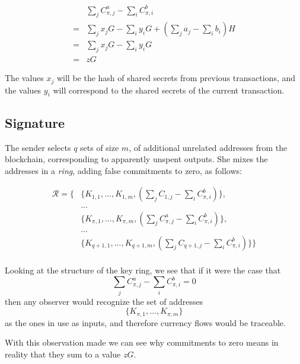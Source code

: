 \begin{align*}
& \sum\limits_j C^a_{\pi, j} - \sum\limits_i C^b_{\pi, i} \\
= & \sum\limits_j x_j G - \sum\limits_i y_i G + (\sum\limits_j  a_j - \sum\limits_i  b_i) H\\
= & \sum\limits_j x_j G - \sum\limits_i y_i G \\
= & z G
\end{align*}

The values \(x_j\) will be the hash of shared secrets from previous transactions, and the values
\(y_i\) will correspond to the shared secrets of the current transaction. 





\subsection{Signature}
\label{full-signature}



The sender selects \(q\) sets of size \(m\), of additional unrelated addresses from the blockchain, corresponding to apparently unspent outputs. 
She mixes the addresses in a {\em ring}, adding false commitments to zero, as follows:

\begin{align*}
  \mathcal{R} = \{ &\{K_{1, 1}, ..., K_{1, m}, (\sum\limits_j C_{1, j} - \sum\limits_i C^b_{\pi,i})\}, \\
  &... \\
  &\{K_{\pi, 1}, ..., K_{\pi, m}, (\sum\limits_j C^a_{\pi, j} - \sum\limits_i C^b_{\pi,i})\}, \\
  &... \\
  &\{K_{q+1, 1}, ..., K_{q+1, m}, (\sum\limits_j C_{q+1, j} - \sum\limits_i C^b_{\pi,i})\}\}
\end{align*}
\\

Looking at the structure of the key ring, we see that if it were the case that \[\sum\limits_j C^a_{\pi, j} -\sum\limits_i C^b_{\pi, i} = 0\] then any observer would recognize the set of addresses
\[\{K_{\pi, 1}, ..., K_{\pi, m}\} \]
as the ones in use as inputs, and therefore currency flows would be traceable.

With this observation made we can see why commitments to zero means in reality that they sum to a value \(z G\).


